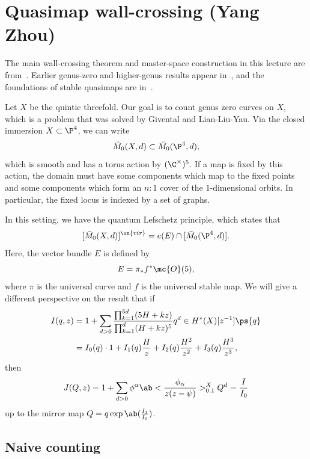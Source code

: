 \section{Quasimap wall-crossing (Yang Zhou)}%
\label{sec:Quasimap wall-crossing (Yang Zhou)}

The main wall-crossing theorem and master-space construction in this lecture are from~\cite{Zhou2022}. Earlier genus-zero and higher-genus results appear in~\cite{CFK2014,CFK2020}, and the foundations of stable quasimaps are in~\cite{CFKM2014}.

Let \(X\) be the quintic threefold. Our goal is to count genus zero curves on \(X\), which is a problem that was solved by Givental and Lian-Liu-Yau. Via the closed immersion \(X \subset \P^4\), we can write
\[ \bar{M}_0(X, d) \subset \bar{M}_0(\P^4, d), \]
which is smooth and has a torus action by \((\C^{\times})^5\). If a map is fixed by this action, the domain must have some components which map to the fixed points and some components which form an \(n :1\) cover of the \(1\)-dimensional orbits. In particular, the fixed locus is indexed by a set of graphs.

In this setting, we have the quantum Lefschetz principle, which states that
\[ [\bar{M}_0(X, d)]^{\on{vir}} = e(E) \cap [\bar{M}_0(\P^4, d)]. \]
Here, the vector bundle \(E\) is defined by
\[ E = \pi_* f^* \mc{O}(5), \]
where \(\pi\) is the universal curve and \(f\) is the universal stable map. We will give a different perspective on the result that if
\begin{align*}
    I(q, z) &= 1 + \sum_{d > 0} \frac{\prod_{k=1}^{5d} (5H+kz)}{\prod_{k=1}^d (H+kz)^5} q^d \in H^*(X)[z^{-1}] \ps{q} \\
    &= I_0(q) \cdot 1 + I_1(q) \frac{H}{z} + I_2(q) \frac{H^2}{z^2} + I_3(q) \frac{H^3}{z^3},
\end{align*}
then
\[ J (Q, z) = 1+ \sum_{d>0} \phi^{\alpha} \ab<\frac{\phi_{\alpha}}{z(z-\psi)}>_{0,1}^X Q^d = \frac{I}{I_0} \]
up to the mirror map \(Q = q \exp\ab(\frac{I_1}{I_0})\). 

\subsection{Naive counting}%
\label{sub:Naive counting}

